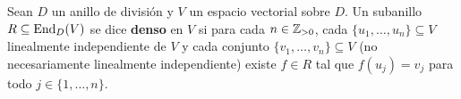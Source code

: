 %
%



\begin{definition}
	Sean $D$ un anillo de división y $V$ un espacio vectorial sobre $D$. Un
	subanillo $R\subseteq\operatorname{End}_D(V)$ se dice \textbf{denso} en $V$ si para cada
	$n\in\mathbb{Z}_{>0}$, cada $\{u_1,\dots,u_n\}\subseteq V$ linealmente independiente de
	$V$ y cada conjunto $\{v_1,\dots,v_n\}\subseteq V$ (no necesariamente
	linealmente independiente) existe $f\in R$ tal que $f(u_j)=v_j$ para todo
	$j\in\{1,\dots,n\}$.
\end{definition}

